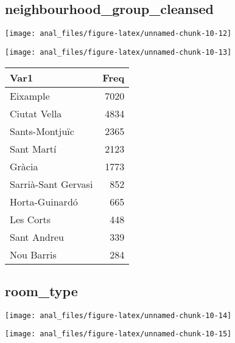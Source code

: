 \centering

\hypertarget{neighbourhood_group_cleansed}{%
\subsection{neighbourhood\_group\_cleansed}\label{neighbourhood_group_cleansed}}

\begin{center}\texttt{[image: anal\_files/figure-latex/unnamed-chunk-10-12]} \end{center}

\begin{center}\texttt{[image: anal\_files/figure-latex/unnamed-chunk-10-13]} \end{center}

\begin{table}[H]
\centering
\begin{tabular}[t]{lr}
\toprule
Var1 & Freq\\
\midrule
Eixample & 7020\\
Ciutat Vella & 4834\\
Sants-Montjuïc & 2365\\
Sant Martí & 2123\\
Gràcia & 1773\\
\addlinespace
Sarrià-Sant Gervasi & 852\\
Horta-Guinardó & 665\\
Les Corts & 448\\
Sant Andreu & 339\\
Nou Barris & 284\\
\bottomrule
\end{tabular}
\end{table}
\pagebreak

\centering

\hypertarget{room_type}{%
\subsection{room\_type}\label{room_type}}

\begin{center}\texttt{[image: anal\_files/figure-latex/unnamed-chunk-10-14]} \end{center}

\begin{center}\texttt{[image: anal\_files/figure-latex/unnamed-chunk-10-15]} \end{center}

